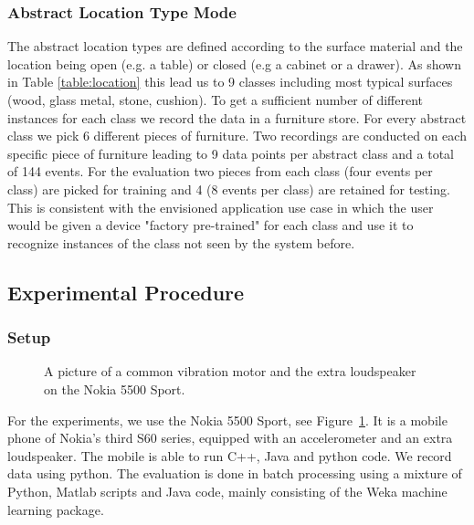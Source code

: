\subsubsection{Abstract Location Type Mode}
The abstract location types are defined according to the surface
material and the location being open (e.g. a table) or closed (e.g a
cabinet or a drawer). As shown in Table \ref{table:location} this
lead us to 9 classes including most typical surfaces (wood, glass
metal, stone, cushion). To get a sufficient number of different instances
for each class we record the data in a furniture store. For
every abstract class we pick 6 different pieces of furniture. Two
recordings are conducted on each specific piece of furniture leading to 9
data points per abstract class and a total of 144 events. For the
evaluation two pieces from each class (four events per
class) are picked for training and 4 (8 events per class) are
retained for testing. This is consistent with the envisioned
application use case in which the user would be given a device "factory 
pre-trained" for each class and use it to recognize instances of the
class not seen by the system before. 

\subsection{Experimental Procedure}

\subsubsection{Setup}


\begin{figure}[t]
\centering  
\caption[Vibration motor and phone loudspeaker]{A picture of a common vibration motor and the extra loudspeaker on the Nokia 5500 Sport.}
\label{fig:hardware}
\end{figure}
For the experiments, we use the Nokia 5500 Sport, see Figure~\ref{fig:hardware}. It is a mobile phone of Nokia's third S60 series, equipped with an accelerometer and an extra loudspeaker. The mobile is able to run C++, Java and python code. We record data using python.
The evaluation is done in batch processing using a mixture of Python, Matlab scripts and Java code, mainly consisting of the Weka machine learning package.

